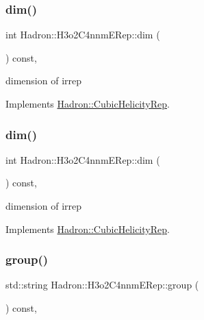 \subsubsection{\texorpdfstring{dim()}{dim()}\hspace{0.1cm}{\footnotesize\ttfamily [1/2]}}
{\footnotesize\ttfamily int Hadron\+::\+H3o2\+C4nnm\+E\+Rep\+::dim (\begin{DoxyParamCaption}{ }\end{DoxyParamCaption}) const\hspace{0.3cm}{\ttfamily [inline]}, {\ttfamily [virtual]}}

dimension of irrep 

Implements \mbox{\hyperlink{structHadron_1_1CubicHelicityRep_a95d229a05580e65f8bdde74a1e316855}{Hadron\+::\+Cubic\+Helicity\+Rep}}.

\mbox{\label{structHadron_1_1H3o2C4nnmERep_a8033496b62e24970283fce0c10203e0c}} 
\subsubsection{\texorpdfstring{dim()}{dim()}\hspace{0.1cm}{\footnotesize\ttfamily [2/2]}}
{\footnotesize\ttfamily int Hadron\+::\+H3o2\+C4nnm\+E\+Rep\+::dim (\begin{DoxyParamCaption}{ }\end{DoxyParamCaption}) const\hspace{0.3cm}{\ttfamily [inline]}, {\ttfamily [virtual]}}

dimension of irrep 

Implements \mbox{\hyperlink{structHadron_1_1CubicHelicityRep_a95d229a05580e65f8bdde74a1e316855}{Hadron\+::\+Cubic\+Helicity\+Rep}}.

\mbox{\label{structHadron_1_1H3o2C4nnmERep_a94fc651e597e1a65fb7be16b3b6e8ef9}} 
\subsubsection{\texorpdfstring{group()}{group()}\hspace{0.1cm}{\footnotesize\ttfamily [1/2]}}
{\footnotesize\ttfamily std\+::string Hadron\+::\+H3o2\+C4nnm\+E\+Rep\+::group (\begin{DoxyParamCaption}{ }\end{DoxyParamCaption}) const\hspace{0.3cm}{\ttfamily [inline]}, {\ttfamily [virtual]}}

